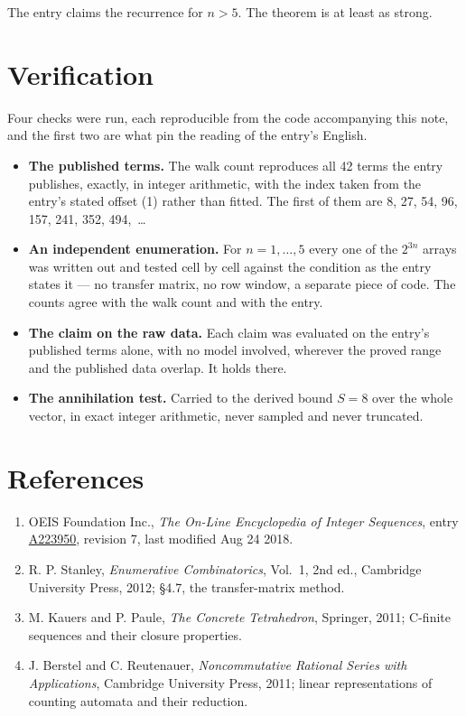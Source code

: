\documentclass[11pt]{article}
\theoremstyle{definition}
\begin{document}
The entry claims the recurrence for $n > 5$. The theorem is at least as strong.

\section{Verification}

Four checks were run, each reproducible from the code accompanying this note, and the first two are what pin the reading of the entry's English.

\begin{itemize}

\item {\bfseries The published terms.} The walk count reproduces all 42 terms the entry publishes, exactly, in integer arithmetic, with the index taken from the entry's stated offset (1) rather than fitted. The first of them are 8, 27, 54, 96, 157, 241, 352, 494,~\dots

\item {\bfseries An independent enumeration.} For $n = 1,\dots,5$ every one of the $2^{3n}$ arrays was written out and tested cell by cell against the condition as the entry states it --- no transfer matrix, no row window, a separate piece of code. The counts agree with the walk count and with the entry.

\item {\bfseries The claim on the raw data.} Each claim was evaluated on the entry's published terms alone, with no model involved, wherever the proved range and the published data overlap. It holds there.

\item {\bfseries The annihilation test.} Carried to the derived bound $S = 8$ over the whole vector, in exact integer arithmetic, never sampled and never truncated.

\end{itemize}

\section{References}

\begin{enumerate}

\item OEIS Foundation Inc., \emph{The On-Line Encyclopedia of Integer Sequences}, entry \href{https://oeis.org/A223950}{A223950}, revision 7, last modified Aug 24 2018.

\item R. P. Stanley, \emph{Enumerative Combinatorics}, Vol.~1, 2nd ed., Cambridge University Press, 2012; \S4.7, the transfer-matrix method.

\item M. Kauers and P. Paule, \emph{The Concrete Tetrahedron}, Springer, 2011; C-finite sequences and their closure properties.

\item J. Berstel and C. Reutenauer, \emph{Noncommutative Rational Series with Applications}, Cambridge University Press, 2011; linear representations of counting automata and their reduction.

\end{enumerate}
\end{document}
